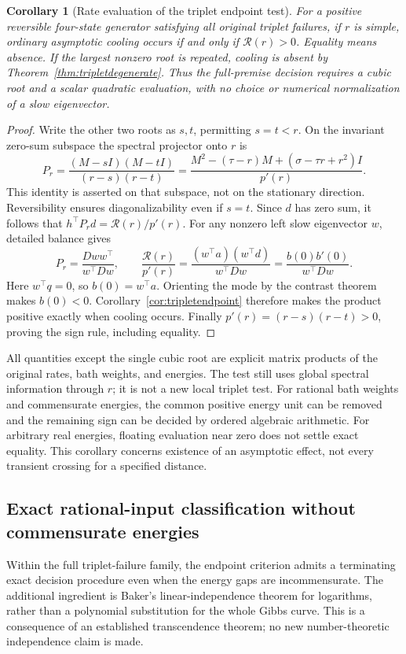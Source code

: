 \documentclass[11pt]{article}
\newtheorem{corollary}{Corollary}
\begin{document}
\begin{corollary}[Rate evaluation of the triplet endpoint test]
\label{cor:rateendpoint}
For a positive reversible four-state generator satisfying all original
triplet failures, if $r$ is simple, ordinary asymptotic cooling occurs
if and only if $\mathcal R(r)>0$. Equality means absence.
If the largest nonzero root is repeated, cooling is absent by
Theorem~\ref{thm:tripletdegenerate}. Thus the full-premise decision
requires a cubic root and a scalar quadratic evaluation, with no
choice or numerical normalization of a slow eigenvector.
\end{corollary}
\begin{proof}
Write the other two roots as $s,t$, permitting $s=t<r$.
On the invariant zero-sum subspace the spectral projector onto $r$ is
\[
P_r=\frac{(M-sI)(M-tI)}{(r-s)(r-t)}
=\frac{M^2-(\tau-r)M+(\sigma-\tau r+r^2)I}{p'(r)}.
\]
This identity is asserted on that subspace, not on the stationary
direction. Reversibility ensures diagonalizability even if $s=t$.
Since $d$ has zero sum, it follows that
$h^\top P_r d=\mathcal R(r)/p'(r)$.
For any nonzero left slow eigenvector $w$, detailed balance gives
\[
P_r=\frac{Dw w^\top}{w^\top Dw},\qquad
\frac{\mathcal R(r)}{p'(r)}
=\frac{(w^\top a)(w^\top d)}{w^\top Dw}
=\frac{b(0)b'(0)}{w^\top Dw}.
\]
Here $w^\top q=0$, so $b(0)=w^\top a$. Orienting the mode by
the contrast theorem makes $b(0)<0$. Corollary~\ref{cor:tripletendpoint}
therefore makes the product positive exactly when cooling occurs.
Finally $p'(r)=(r-s)(r-t)>0$, proving the sign rule, including equality.
\end{proof}

All quantities except the single cubic root are explicit matrix products
of the original rates, bath weights, and energies. The test still uses
global spectral information through $r$; it is not a new local triplet
test. For rational bath weights and commensurate energies, the common
positive energy unit can be removed and the remaining sign can be
decided by ordered algebraic arithmetic. For arbitrary real energies,
floating evaluation near zero does not settle exact equality. This
corollary concerns existence of an asymptotic effect, not every transient
crossing for a specified distance.

\subsection{Exact rational-input classification without commensurate energies}
\label{sec:rationallogendpoint}
Within the full triplet-failure family, the endpoint criterion admits a
terminating exact decision procedure even when the energy gaps are
incommensurate. The additional ingredient is Baker's linear-independence
theorem for logarithms, rather than a polynomial substitution for the whole
Gibbs curve. This is a consequence of an established transcendence theorem;
no new number-theoretic independence claim is made.
\end{document}
